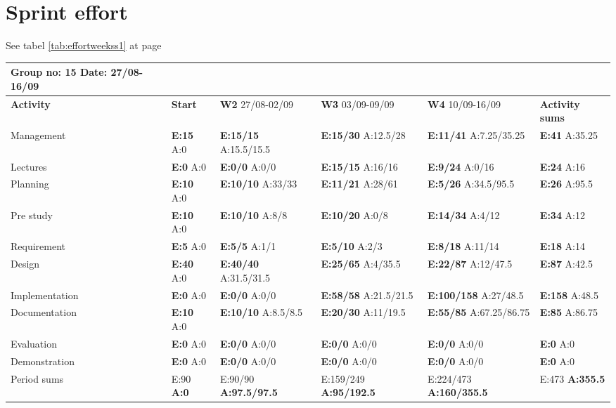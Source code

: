 \section{Sprint effort}

See tabel \ref{tab:effortweekss1} at page \pageref{tab:effortweekss1}
\begin{table}
\begin{tabularx}{\linewidth}{>{\setlength\hsize{.625\hsize}}X|>{\setlength\hsize{0.3\hsize}}X|>{\setlength\hsize{0.5\hsize}}X|>{\setlength\hsize{0.5\hsize}}X|>{\setlength\hsize{0.5\hsize}}X|>{\setlength\hsize{.3\hsize}}X}
Group no: 15 Date: 27/08-16/09  \\ \hline
\textbf{Activity} & \textbf{Start} & \textbf{W2} 27/08-02/09 & \textbf{W3} 03/09-09/09 & \textbf{W4} 10/09-16/09 & \textbf{Activity sums} \\ \hline \hline
Management & \textbf{E:15} A:0 & \textbf{E:15/15} A:15.5/15.5 & \textbf{E:15/30} A:12.5/28 & \textbf{E:11/41} A:7.25/35.25 & \textbf{E:41} A:35.25  \\ \hline
Lectures & \textbf{E:0} A:0 & \textbf{E:0/0} A:0/0 & \textbf{E:15/15} A:16/16 & \textbf{E:9/24} A:0/16 & \textbf{E:24 } A:16  \\ \hline
Planning & \textbf{E:10} A:0 & \textbf{E:10/10} A:33/33 & \textbf{E:11/21} A:28/61 & \textbf{E:5/26} A:34.5/95.5 & \textbf{E:26 } A:95.5  \\ \hline
Pre study & \textbf{E:10} A:0 & \textbf{E:10/10} A:8/8 & \textbf{E:10/20} A:0/8 & \textbf{E:14/34} A:4/12 & \textbf{E:34 } A:12  \\ \hline
Requirement & \textbf{E:5} A:0 & \textbf{E:5/5} A:1/1 & \textbf{E:5/10} A:2/3 & \textbf{E:8/18} A:11/14 & \textbf{E:18 } A:14  \\ \hline
Design & \textbf{E:40} A:0 & \textbf{E:40/40} A:31.5/31.5 & \textbf{E:25/65} A:4/35.5 & \textbf{E:22/87} A:12/47.5 & \textbf{E:87 } A:42.5  \\ \hline
Implementation & \textbf{E:0} A:0 & \textbf{E:0/0} A:0/0 & \textbf{E:58/58} A:21.5/21.5 & \textbf{E:100/158} A:27/48.5 & \textbf{E:158 } A:48.5  \\ \hline
Documentation & \textbf{E:10} A:0 & \textbf{E:10/10} A:8.5/8.5 & \textbf{E:20/30} A:11/19.5 & \textbf{E:55/85} A:67.25/86.75 & \textbf{E:85 } A:86.75  \\ \hline
Evaluation & \textbf{E:0} A:0 & \textbf{E:0/0} A:0/0 & \textbf{E:0/0} A:0/0 & \textbf{E:0/0} A:0/0 & \textbf{E:0 } A:0  \\ \hline
Demonstration & \textbf{E:0} A:0 & \textbf{E:0/0} A:0/0 & \textbf{E:0/0} A:0/0 & \textbf{E:0/0} A:0/0 & \textbf{E:0 } A:0  \\ \hline
Period sums & E:90 \textbf{A:0} & E:90/90 \textbf{A:97.5/97.5} & E:159/249 \textbf{A:95/192.5} & E:224/473 \textbf{A:160/355.5} & E:473 \textbf{A:355.5}
\end{tabularx}


\end{table}
